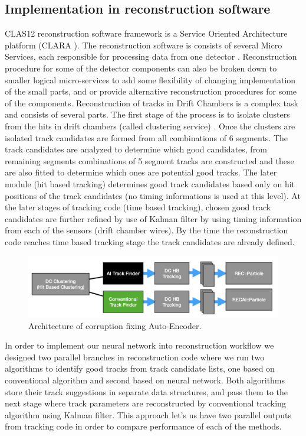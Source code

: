 \subsection{Implementation in reconstruction software}

CLAS12 reconstruction software framework is a Service Oriented Architecture platform (CLARA \cite{Gyurjyan:2011zz}).
The reconstruction software is consists of several Micro Services, each responsible for processing data from one
detector \cite{Ziegler:2020gsr}. Reconstruction procedure for some of the detector components can also 
be broken down to smaller logical micro-services to add some flexibility of changing implementation of the small parts, 
and or provide alternative reconstruction procedures for some of the components.
Reconstruction of tracks in Drift Chambers is a complex task and consists of several parts.
The first stage of the process is to isolate clusters
from the hits in drift chambers (called clustering service) . Once the clusters are isolated track candidates are formed from all combinations 
of 6 segments. The track candidates are analyzed to determine which good candidates, from remaining segments 
combinations of 5 segment tracks are constructed and these are also fitted to determine which ones are potential good tracks.
The later module (hit based tracking) determines good track candidates based only on hit positions of the track candidates (no timing
informations is used at this level). At the later stages of tracking code (time based tracking), chosen good track candidates are further refined by use of Kalman filter by using timing information from each of the sensors (drift chamber wires). By the time the reconstruction code reaches time based
tracking stage the track candidates are already defined. 

\begin{figure}[!ht]
\begin{center}
 \includegraphics[width=6.0in]{images/recon_diagram.png}
\caption {Architecture of corruption fixing Auto-Encoder.}
 \label{recon:diagram}
 \end{center}
\end{figure}

In order to implement our neural network into reconstruction workflow we designed two parallel branches in reconstruction code where we run 
two algorithms to identify good tracks from track candidate lists, one based on conventional algorithm and second based on neural network.
Both algorithms store their track suggestions in separate data structures, and pass them to the next stage where track parameters are reconstructed by 
conventional tracking algorithm using Kalman filter. This approach let's us have two parallel outputs from tracking code in order to compare performance of
each of the methods.

